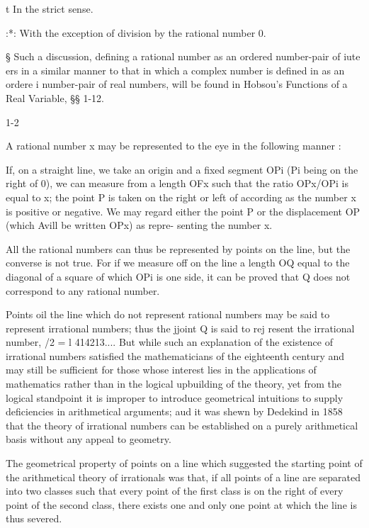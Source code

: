 t In the strict sense.

:*: With the exception of division by the rational number 0.

§ Such a discussion, defining a rational number as an ordered
number-pair of iute ers in a similar manner to that in which a complex
number is defined in as an ordere i number-pair of real numbers,
will be found in Hobsou's Functions of a Real Variable, §§ 1-12.

1-2

%
%

A rational number x may be represented to the eye in the following
manner :

If, on a straight line, we take an origin and a fixed segment OPi (Pi
being on the right of 0), we can measure from a length OFx such that
the ratio OPx/OPi is equal to x; the point P is taken on the right or
left of according as the number x is positive or negative. We may
regard either the point P or the displacement OP (which Avill be
written OPx) as repre- senting the number x.

All the rational numbers can thus be represented by points on the
line, but the converse is not true. For if we measure off on the line
a length OQ equal to the diagonal of a square of which OPi is one
side, it can be proved that Q does not correspond to any rational
number.

Points oil the line which do not represent rational numbers may be
said to represent irrational numbers; thus the jjoint Q is said to
rej resent the irrational number, /2 = l 414213.... But while such
an explanation of the existence of irrational numbers satisfied the
mathematicians of the eighteenth century and may still be sufficient
for those whose interest lies in the applications of mathematics
rather than in the logical upbuilding of the theory, yet from the
logical standpoint it is improper to introduce geometrical intuitions
to supply deficiencies in arithmetical arguments; aud it was shewn by
Dedekind in 1858 that the theory of irrational numbers can be
established on a purely arithmetical basis without any appeal to
geometry.


The geometrical property of points on a line which suggested the
starting point of the arithmetical theory of irrationals was that, if
all points of a line are separated into two classes such that every
point of the first class is on the right of every point of the second
class, there exists one and only one point at which the line is thus
severed.

